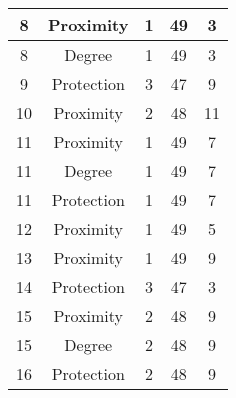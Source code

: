 \documentclass[results.tex]{subfiles}
\begin{document}
\begin{center}
\begin{tabular}{| c || c | c | c | c |}
            \hline
            8                       & Proximity                    & 1                      & 49                      & 3                    \\
            \hline
            8                       & Degree                       & 1                      & 49                      & 3                    \\
            \hline
            9                       & Protection                   & 3                      & 47                      & 9                    \\
            \hline
            10                      & Proximity                    & 2                      & 48                      & 11                   \\
            \hline
            11                      & Proximity                    & 1                      & 49                      & 7                    \\
            \hline
            11                      & Degree                       & 1                      & 49                      & 7                    \\
            \hline
            11                      & Protection                   & 1                      & 49                      & 7                    \\
            \hline
            12                      & Proximity                    & 1                      & 49                      & 5                    \\
            \hline
            13                      & Proximity                    & 1                      & 49                      & 9                    \\
            \hline
            14                      & Protection                   & 3                      & 47                      & 3                    \\
            \hline
            15                      & Proximity                    & 2                      & 48                      & 9                    \\
            \hline
            15                      & Degree                       & 2                      & 48                      & 9                    \\
            \hline
            16                      & Protection                   & 2                      & 48                      & 9                    \\

\end{tabular}
\end{center}
\end{document}
